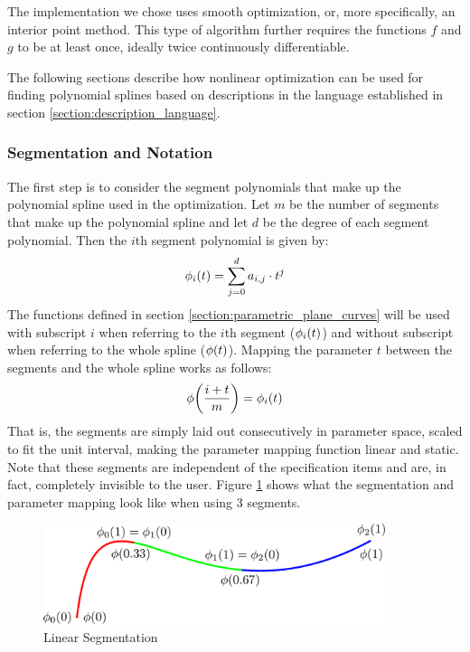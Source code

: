 \documentclass[a4paper]{article}
\begin{document}
				The implementation we chose uses smooth optimization, or, more specifically, an interior point method. This type of algorithm further requires the functions \(f\) and \(g\) to be at least once, ideally twice continuously differentiable.

				The following sections describe how nonlinear optimization can be used for finding polynomial splines based on descriptions in the language established in section \ref{section:description_language}.

			\subsubsection{Segmentation and Notation}
			\label{section:segmentation_notation}

				The first step is to consider the segment polynomials that make up the polynomial spline used in the optimization. Let \(m\) be the number of segments that make up the polynomial spline and let \(d\) be the degree of each segment polynomial. Then the \(i\)th segment polynomial is given by:
				\begin{equation*}
					\phi_i\!\left( t \right) = \sum_{j = 0}^{d} a_{i,j} \cdot t^j
				\end{equation*}
				The functions defined in section \ref{section:parametric_plane_curves} will be used with subscript \(i\) when referring to the \(i\)th segment (\(\phi_i\!\left( t \right)\)) and without subscript when referring to the whole spline (\(\phi\!\left( t \right)\)). Mapping the parameter \(t\) between the segments and the whole spline works as follows:
				\begin{equation*}
					\phi\!\left( \frac{i + t}{m} \right) = \phi_i\!\left( t \right)
				\end{equation*}
				That is, the segments are simply laid out consecutively in parameter space, scaled to fit the unit interval, making the parameter mapping function linear and static. Note that these segments are independent of the specification items and are, in fact, completely invisible to the user. Figure \ref{figure:linear_segmentation} shows what the segmentation and parameter mapping look like when using 3 segments.

				\begin{figure}[htb]
					\centering
					\includegraphics[width=100mm]{content/output/linear_segmentation.pdf}
					\caption{Linear Segmentation}
					\label{figure:linear_segmentation}
				\end{figure}
\end{document}
